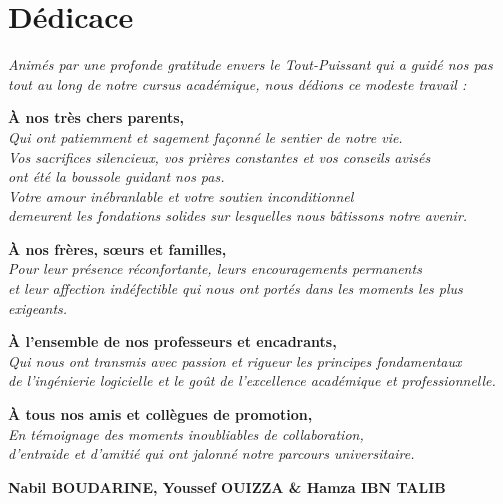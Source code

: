 \documentclass[12pt,a4paper,oneside]{report}
\begin{document}
\setcounter{page}{1}

\chapter*{Dédicace}

\vspace*{2cm}

\begin{center}
\textit{Animés par une profonde gratitude envers le Tout-Puissant qui a guidé nos pas tout au long de notre cursus académique, nous dédions ce modeste travail :}

\vspace{1cm}
\textbf{À nos très chers parents,}\\[0.3cm]
\textit{Qui ont patiemment et sagement façonné le sentier de notre vie.\\
Vos sacrifices silencieux, vos prières constantes et vos conseils avisés\\
ont été la boussole guidant nos pas.\\
Votre amour inébranlable et votre soutien inconditionnel\\
demeurent les fondations solides sur lesquelles nous bâtissons notre avenir.}

\vspace{0.8cm}
\textbf{À nos frères, sœurs et familles,}\\[0.2cm]
\textit{Pour leur présence réconfortante, leurs encouragements permanents\\
et leur affection indéfectible qui nous ont portés dans les moments les plus exigeants.}

\vspace{0.8cm}
\textbf{À l'ensemble de nos professeurs et encadrants,}\\[0.2cm]
\textit{Qui nous ont transmis avec passion et rigueur les principes fondamentaux\\
de l'ingénierie logicielle et le goût de l'excellence académique et professionnelle.}

\vspace{0.8cm}
\textbf{À tous nos amis et collègues de promotion,}\\[0.2cm]
\textit{En témoignage des moments inoubliables de collaboration,\\
d'entraide et d'amitié qui ont jalonné notre parcours universitaire.}

\vspace{1.5cm}
\textbf{Nabil BOUDARINE, Youssef OUIZZA \& Hamza IBN TALIB}
\end{center}
\end{document}

